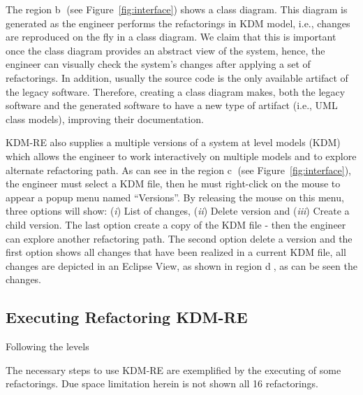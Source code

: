 The region \textcircled{b} (see Figure~\ref{fig:interface}) shows a class diagram. This diagram is generated as the engineer performs the refactorings in KDM model, i.e., changes are reproduced on the fly in a class diagram.
We claim that this is important once the class diagram provides an abstract view of the system, hence, the engineer can visually check the system's changes after applying a set of refactorings. 
In addition, usually the source code is the only available artifact of the legacy software. 
Therefore, creating a class diagram makes, both the legacy software and the generated software to have a new type of artifact (i.e., UML class models), improving their documentation.

KDM-RE also supplies a multiple versions of a system at level models (KDM) which allows the engineer to work interactively on multiple models and to explore alternate refactoring path. As can see in the region \textcircled{c} (see Figure~\ref{fig:interface}), the engineer must select a KDM file, then he must right-click on the mouse to appear a popup menu named ``Versions''. By releasing the mouse on this menu, three options will show: (\textit{i}) List of changes, (\textit{ii}) Delete version and (\textit{iii}) Create a child version. The last option create a copy of the KDM file - then the engineer can explore another refactoring path. The second option delete a version and the first option shows all changes that have been realized in a current KDM file, all changes are depicted in an Eclipse View, as shown in region \textcircled{d}, as can be seen the changes.


\subsection{Executing Refactoring KDM-RE}

Following the levels 

The necessary steps to use KDM-RE are exemplified by the executing of some refactorings. Due space limitation herein is not shown all 16 refactorings. 


